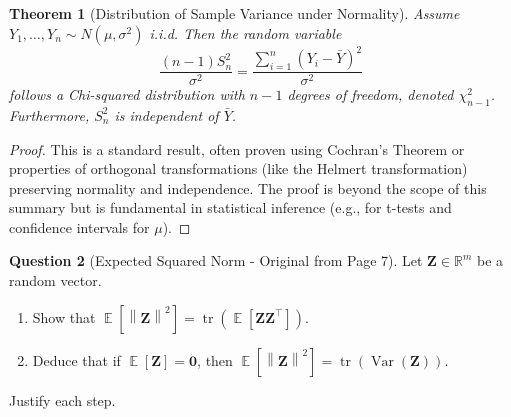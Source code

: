 \documentclass[11pt, a4paper]{article}
\DeclareMathOperator{\E}{\mathbb{E}}             %
\DeclareMathOperator{\Var}{\mathrm{Var}}         %
\DeclareMathOperator{\tr}{\mathrm{tr}}           %
\newtheorem{theorem}{Theorem}[section]
\theoremstyle{definition}
\newtheorem{question}[theorem]{Question} %
\theoremstyle{remark}
\newcommand{\RR}{\mathbb{R}}             %
\newcommand{\vect}[1]{\bm{#1}}          %
\newcommand{\transpose}{^{\top}}        %
\newcommand{\norm}[1]{\left\| #1 \right\|} %
\begin{document}
\begin{theorem}[Distribution of Sample Variance under Normality]
Assume $Y_1, \dots, Y_n \sim N(\mu, \sigma^2)$ i.i.d. Then the random variable
\[ \frac{(n-1)S_n^2}{\sigma^2} = \frac{\sum_{i=1}^n (Y_i - \bar{Y})^2}{\sigma^2} \]
follows a Chi-squared distribution with $n-1$ degrees of freedom, denoted $\chi_{n-1}^2$. Furthermore, $S_n^2$ is independent of $\bar{Y}$.
\end{theorem}
\begin{proof}
This is a standard result, often proven using Cochran's Theorem or properties of orthogonal transformations (like the Helmert transformation) preserving normality and independence. The proof is beyond the scope of this summary but is fundamental in statistical inference (e.g., for t-tests and confidence intervals for $\mu$).
\end{proof}

\begin{question}[Expected Squared Norm - Original from Page 7]
Let $\vect{Z} \in \RR^m$ be a random vector.
\begin{enumerate}
    \item Show that $\E[\norm{\vect{Z}}^2] = \tr(\E[\vect{Z}\vect{Z}\transpose])$.
    \item Deduce that if $\E[\vect{Z}] = \vect{0}$, then $\E[\norm{\vect{Z}}^2] = \tr(\Var(\vect{Z}))$.
\end{enumerate}
Justify each step.
\end{question}
\end{document}
